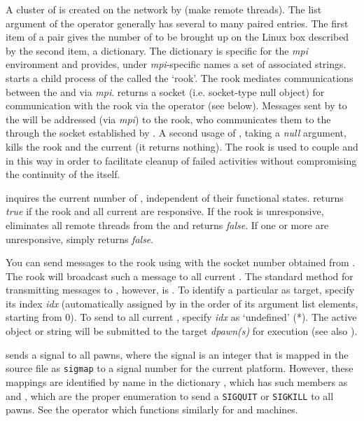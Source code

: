 A cluster of  is created on the network by
 (make remote threads). The list argument of the
operator generally has several to many paired entries. The first item
of a pair gives the number of  to be brought up
on the Linux box described by the second item, a dictionary. The
dictionary is specific for the \emph{mpi} environment and provides,
under \emph{mpi}-specific names a set of associated
strings.  starts a child process of the 
called the `rook'. The rook mediates communications between the
 and  via
\emph{mpi}.  returns a socket (i.e. socket-type null
object) for communication with the rook via the  operator
 (see below). Messages sent by  to the
 will be addressed (via \emph{mpi}) to the rook, who
communicates them to the  through the socket established
by . A second usage of , taking a
\emph{null} argument, kills the rook and the current
 (it returns nothing). The rook is used to couple
 and  in this way in order to
facilitate cleanup of failed  activities without
compromising the continuity of the  itself.

 inquires the current number of ,
independent of their functional states.  returns
\emph{true} if the rook and all current  are
responsive. If the rook is unresponsive,  eliminates
all remote threads from the  and returns \emph{false}. If
one or more  are unresponsive, 
simply returns \emph{false}.

You can send messages to the rook using  with the socket
number obtained from . The rook will broadcast such a
message to all current . The standard method for
transmitting messages to , however, is
. To identify a particular  as target, specify
its index \emph{idx} (automatically assigned by  in
the order of its argument list elements, starting from 0). To send to
all current , specify \emph{idx} as `undefined'
(*). The active object or string will be submitted to the target
\emph{dpawn(s)} for execution (see also ).

 sends a signal to all pawns, where the signal is an
integer that is mapped in the source file  as
\texttt{sigmap} to a signal number for the current platform. However,
these mappings are identified by name in the dictionary
, which has such members as  and
, which are the proper enumeration to send a
\texttt{SIGQUIT} or \texttt{SIGKILL} to all pawns. See the
 operator which functions similarly for  and
 machines.

